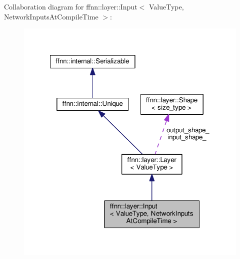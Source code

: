 Collaboration diagram for ffnn\-:\-:layer\-:\-:Input$<$ Value\-Type, Network\-Inputs\-At\-Compile\-Time $>$\-:\nopagebreak
\begin{figure}[H]
\begin{center}
\leavevmode
\includegraphics[width=318pt]{classffnn_1_1layer_1_1_input__coll__graph}
\end{center}
\end{figure}
